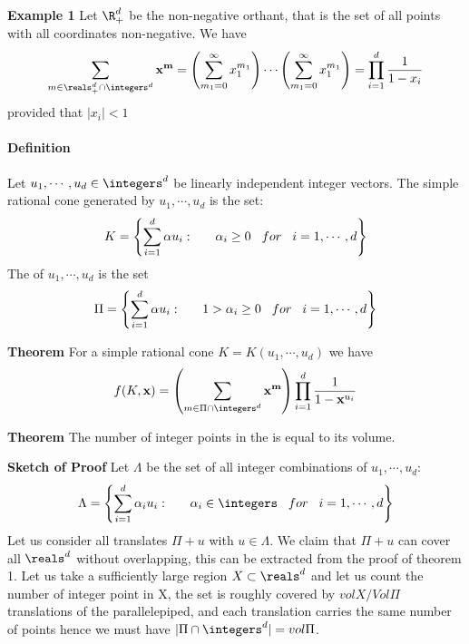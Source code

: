 \begin{description}
\textbf{Example 1}
Let $\R_+^d$ be the non-negative orthant, that is the set of all points
with all coordinates non-negative. We have
$$
\sum_{m\in\reals^d_+\cap\integers^d}\mathbf{x}^\mathbf{m} =
   \left(\sum^{\infty}_{m_1=0}x_1^{m_1}\right)\cdots\left(\sum^{\infty}_{m_1=0}x_1^{m_1}\right)=
   \prod_{i=1}^d\frac{1}{1-x_i}
$$
provided that $|x_i|<1$

\paragraph{Definition } Let $u_1,\cdots ,u_d\in\integers^d$ be linearly independent integer vectors. The simple rational cone generated by $u_1,\cdots ,u_d$ is the set:
$$K=\left\lbrace\sum^d_{i=1}\alpha u_i:\hspace{6mm}\alpha_i\geq 0 \hspace{3mm}for\hspace{3mm}i=1,\cdots ,d\right\rbrace$$
The {\fundPip} of $u_1,\cdots ,u_d$ is the set
$$\Pi=\left\lbrace\sum^d_{i=1}\alpha u_i:\hspace{6mm}1>\alpha_i\geq 0 \hspace{3mm}for\hspace{3mm}i=1,\cdots ,d\right\rbrace$$

\textbf{Theorem}
For a simple rational cone $K=K(u_1,\cdots ,u_d)$ we have
$$f(K,\mathbf{x})=\left(\sum_{m\in\Pi\cap\integers^d}\mathbf{x}^\mathbf{m}\right)\prod_{i=1}^d\frac{1}{1-\mathbf{x}^{u_i}}$$

\textbf{Theorem}
The number of integer points in the {\fundPip} is equal to its volume.

\textbf{Sketch of Proof}
Let $\Lambda$ be the set of all integer combinations of $u_1,\cdots ,u_d$:
$$\Lambda=\left\lbrace\sum^d_{i=1}\alpha_i u_i:\hspace{6mm}\alpha_i\in\integers \hspace{3mm}for\hspace{3mm}i=1,\cdots ,d\right\rbrace$$
Let us consider all translates $\Pi+u$ with $u\in\Lambda$. We claim that
$\Pi+u$ can cover all $\reals^d$ without overlapping, this can be
extracted from the proof of theorem 1. Let us take a sufficiently large
region $X\subset\reals^d$ and let us count the number of integer point in
X, the set is roughly covered by $vol X/Vol\Pi$ translations of the
parallelepiped, and each translation carries the same number of points
hence we must have $|\Pi\cap\integers^d|=vol\Pi$.



\end{description}
